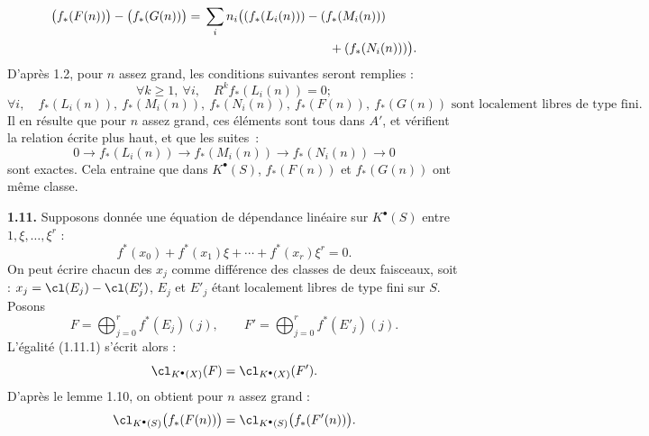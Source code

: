 \[
\begin{aligned}
  \bigl(f_*(F(n))\bigr)-\bigl(f_*(G(n))\bigr)
  ={}&\sum_i n_i\bigl((f_*(L_i(n)))-(f_*(M_i(n)))\\
      &\hspace{35mm}+(f_*(N_i(n)))\bigr).
\end{aligned}
\]
D'après 1.2,
pour \(n\) assez grand, les conditions suivantes seront remplies :
\[
  \forall k\geq1,\ \forall i,
  \quad R^k f_*(L_i(n))=0;
\]
\[
  \forall i,
  \quad f_*(L_i(n)),\ f_*(M_i(n)),\ f_*(N_i(n)),\ f_*(F(n)),\ f_*(G(n))
  \text{ sont localement libres de type fini.}
\]
Il en résulte que pour \(n\) assez grand, ces éléments sont tous dans \(A'\), et vérifient la relation écrite plus haut, et que les suites~:
\[
  0\longrightarrow f_*(L_i(n))\longrightarrow f_*(M_i(n))\longrightarrow f_*(N_i(n))\longrightarrow0
\]
sont exactes. Cela entraine que dans \(K^{\bullet}(S)\), \(f_*(F(n))\) et \(f_*(G(n))\) ont même classe.

\textbf{1.11.} Supposons donnée une équation de dépendance linéaire sur \(K^{\bullet}(S)\) entre \(1,\xi,\ldots,\xi^r\) :
\begin{equation}\tag{1.11.1}
  f^*(x_0)+f^*(x_1)\xi+\cdots+f^*(x_r)\xi^r=0.
\end{equation}
On peut écrire chacun des \(x_j\) comme différence des classes de deux faisceaux, soit : \(x_j=\cl(E_j)-\cl(E'_j)\), \(E_j\) et \(E'_j\) étant localement libres de type fini sur \(S\). Posons
\[
  F=\bigoplus_{j=0}^r f^*(E_j)(j),
  \qquad
  F'=\bigoplus_{j=0}^r f^*(E'_j)(j).
\]
L'égalité (1.11.1) s'écrit alors :
\[
  \cl_{K^{\bullet}(X)}(F)=\cl_{K^{\bullet}(X)}(F').
\]
D'après le lemme 1.10, on obtient pour \(n\) assez grand :
\[
  \cl_{K^{\bullet}(S)}\bigl(f_*(F(n))\bigr)=\cl_{K^{\bullet}(S)}\bigl(f_*(F'(n))\bigr).
\]
